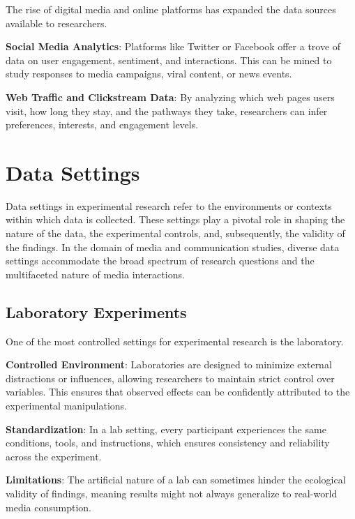 \documentclass[
  b5paper]{book}
\begin{document}
The rise of digital media and online platforms has expanded the data sources available to researchers.

\textbf{Social Media Analytics}: Platforms like Twitter or Facebook offer a trove of data on user engagement, sentiment, and interactions. This can be mined to study responses to media campaigns, viral content, or news events.

\textbf{Web Traffic and Clickstream Data}: By analyzing which web pages users visit, how long they stay, and the pathways they take, researchers can infer preferences, interests, and engagement levels.

\hypertarget{data-settings}{%
\section{Data Settings}\label{data-settings}}

Data settings in experimental research refer to the environments or contexts within which data is collected. These settings play a pivotal role in shaping the nature of the data, the experimental controls, and, subsequently, the validity of the findings. In the domain of media and communication studies, diverse data settings accommodate the broad spectrum of research questions and the multifaceted nature of media interactions.

\hypertarget{laboratory-experiments}{%
\subsection*{Laboratory Experiments}\label{laboratory-experiments}}

One of the most controlled settings for experimental research is the laboratory.

\textbf{Controlled Environment}: Laboratories are designed to minimize external distractions or influences, allowing researchers to maintain strict control over variables. This ensures that observed effects can be confidently attributed to the experimental manipulations.

\textbf{Standardization}: In a lab setting, every participant experiences the same conditions, tools, and instructions, which ensures consistency and reliability across the experiment.

\textbf{Limitations}: The artificial nature of a lab can sometimes hinder the ecological validity of findings, meaning results might not always generalize to real-world media consumption.
\end{document}
